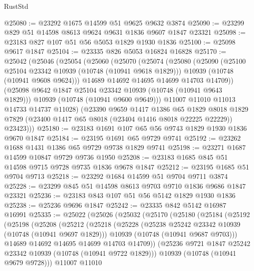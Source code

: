 \begin{lexlean}{RustStd}
\begin{coremodule}
{\begin{coremodule}
{{{{{@25080 := @23292 @1675 @14599 @51 @9625 @9632 @3874
@25090 := @23299 @829 @51 @14598 @8613 @9624 @9631 @1836 @9607 @1847 @23321
@25098 := @23183 @827 @107 @51 @56 @5053 @1829 @1930 @1836
@25100 := @25098 @9617 @1847
@25104 := @23335 @826 @5053 @16824 @16828
@25170 := @25042
    (@25046
      (@25054
        (@25060
          (@25070
            (@25074
              (@25080
                (@25090
                  (@25100 @25104 @23342 @10939 (@10748 (@10941 @9618 @1829)))
                  @10939
                  (@10748 (@10941 @9608 @9624)))
                @14689
                @14692
                @14695
                @14699
                @14703
                @14709))
            (@25098 @9642 @1847 @25104 @23342 @10939 (@10748 (@10941 @9643 @1829)))
            @10939
            (@10748 (@10941 @9600 @9649)))
          @11007
          @11010
          @11013
          @14733
          @14737
          @11028)
        (@23390
          @9659
          @1417
          @1386
          @65
          @1829
          @8018
          @1829
          @7829
          (@23400 @1417 @65 @8018 (@23404 @1416 @8018 @22225 @22229))
          @23423)))
@25180 := @23183 @1691 @107 @65 @56 @9743 @1829 @1930 @1836 @9670 @1847
@25184 := @23195 @1691 @65 @9729 @9741
@25192 := @23262 @1688 @1431 @1386 @65 @9729 @9738 @1829 @9741
@25198 := @23271 @1687 @14599 @10847 @9729 @9736 @1950
@25208 := @23183 @1685 @845 @51 @14598 @9715 @9728 @9735 @1836 @9678 @1847
@25212 := @23195 @1685 @51 @9704 @9713
@25218 := @23292 @1684 @14599 @51 @9704 @9711 @3874
@25228 := @23299 @845 @51 @14598 @8613 @9703 @9710 @1836 @9686 @1847 @23321
@25236 := @23183 @843 @107 @51 @56 @5142 @1829 @1930 @1836
@25238 := @25236 @9696 @1847
@25242 := @23335 @842 @5142 @16987 @16991
@25335 := @25022
    (@25026
      (@25032
        (@25170
          (@25180
            (@25184
              (@25192
                (@25198
                  (@25208
                    (@25212
                      (@25218
                        (@25228
                          (@25238 @25242 @23342 @10939 (@10748 (@10941 @9697 @1829)))
                          @10939
                          (@10748 (@10941 @9687 @9703)))
                        @14689
                        @14692
                        @14695
                        @14699
                        @14703
                        @14709))
                    (@25236 @9721 @1847 @25242 @23342 @10939 (@10748 (@10941 @9722 @1829)))
                    @10939
                    (@10748 (@10941 @9679 @9728)))
                  @11007
                  @11010
}}}}}
\end{coremodule}}
\end{coremodule}
\end{lexlean}

